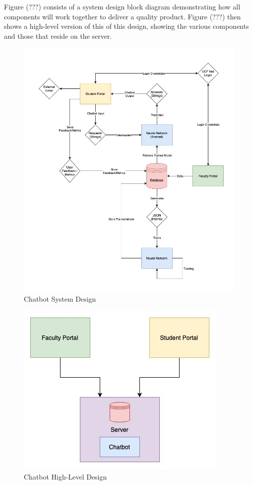 \documentclass[titlepage, 12pt]{article}
\begin{document}
Figure (???) consists of a system design block diagram demonstrating how all components will work together to deliver a quality product. Figure (???) then shows a high-level version of this of this design, showing the various components and those that reside on the server.

\begin{figure}[p]
    \centering\includegraphics[width=1\linewidth]{images/system-design.jpg}
    \caption{Chatbot System Design}
\end{figure}

\pagebreak

\begin{figure}[h]
    \centering\includegraphics[width=0.5\linewidth]{images/high-level-design.jpg}
    \caption{Chatbot High-Level Design}
\end{figure}
\end{document}
